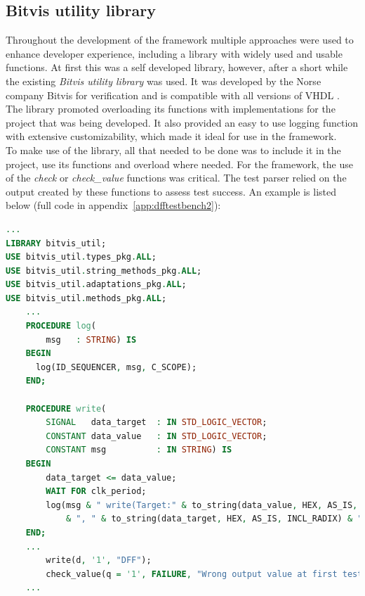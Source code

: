\documentclass[11pt,british]{article}
\begin{document}
\subsection{Bitvis utility library}
\label{subsec:bitvis}
Throughout the development of the framework multiple approaches were used to enhance developer experience, including a library with widely used and usable functions. At first this was a self developed library, however, after a short while the existing \emph{Bitvis utility library} was used. It was developed by the Norse company Bitvis for verification and is compatible with all versions of \gls{VHDL} \cite{bitvis}. The library promoted overloading its functions with implementations for the project that was being developed. It also provided an easy to use logging function with extensive customizability, which made it ideal for use in the framework.
\\[\baselineskip]
To make use of the library, all that needed to be done was to include it in the project, use its functions and overload where needed. For the framework, the use of the \emph{check} or \emph{check\_value} functions was critical. The test parser relied on the output created by these functions to assess test success. An example is listed below (full code in appendix~\ref{app:dfftestbench2}):
\begin{lstlisting}[language=VHDL, tabsize=4, frame=single, framesep=2mm, belowskip=8pt, aboveskip=8pt, showstringspaces=false, basicstyle=\footnotesize]
...
LIBRARY bitvis_util;
USE bitvis_util.types_pkg.ALL;
USE bitvis_util.string_methods_pkg.ALL;
USE bitvis_util.adaptations_pkg.ALL;
USE bitvis_util.methods_pkg.ALL;
	...
	PROCEDURE log(
    	msg   : STRING) IS
    BEGIN
      log(ID_SEQUENCER, msg, C_SCOPE);
    END;
    
	PROCEDURE write(
    	SIGNAL   data_target  : IN STD_LOGIC_VECTOR;
    	CONSTANT data_value   : IN STD_LOGIC_VECTOR;
    	CONSTANT msg          : IN STRING) IS
    BEGIN
    	data_target <= data_value;
    	WAIT FOR clk_period;
    	log(msg & " write(Target:" & to_string(data_value, HEX, AS_IS, INCL_RADIX) 
    		& ", " & to_string(data_target, HEX, AS_IS, INCL_RADIX) & ")";);
    END;
	...
		write(d, '1', "DFF");
		check_value(q = '1', FAILURE, "Wrong output value at first test");
	...
\end{lstlisting}

\end{document}
